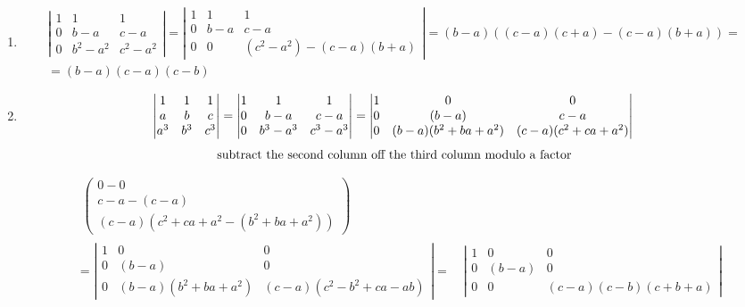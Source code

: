 \documentclass[twoside]{amsart}
\theoremstyle{plain}
\theoremstyle{definition}
\newcommand{\exercisehead}[1]
  {
   \noindent{\small\bf Exercise #1.}
   \smallskip}
\begin{document}
\exercisehead{3}
\begin{enumerate}
\item \[
  \begin{gathered}
\left| \begin{matrix} 1 & 1 & 1 \\ 0 & b-a & c-a \\ 0 & b^2 - a^2 & c^2 - a^2 \end{matrix} \right| = \left| \begin{matrix} 1 & 1 & 1 \\ 0 & b-a & c-a \\ 0 & 0 & (c^2 - a^2)-(c-a)(b+a) \end{matrix} \right| = (b-a)((c-a)(c+a) - (c-a)(b+a)) = \\ 
= \boxed{ (b-a)(c-a)(c-b)  }
\end{gathered}
\]
\item \[
      \left| \begin{matrix} 1 & 1 & 1 \\ a & b & c \\ a^3 & b^3 & c^3 \end{matrix} \right|  = \left| \begin{matrix} 1 & 1 & 1 \\ 0 & b-a & c-a \\ 0 & b^3 -a^3 & c^3 -a^3 \end{matrix} \right| = \left| \begin{matrix} 1 & 0 & 0 \\ 0 & (b-a) & c-a \\ 0 & (b-a)(b^2 + ba + a^2) & (c-a)(c^2 + ca + a^2) \end{matrix} \right| \\
\]
\[
      \text{ subtract the second column off the third column modulo a factor }  \\
\]
\[
\begin{aligned}
 & \begin{gathered}
      \left( \begin{matrix} 0 - 0 \\ c-a - (c-a) \\ (c-a)( c^2 + ca + a^2 - (b^2 + ba +a^2) ) \end{matrix} \right)
\end{gathered} \\
    & = \left| \begin{matrix} 1 & 0 & 0 \\ 0 & (b-a) & 0 \\ 0 & (b-a)(b^2 +ba +a^2) & (c-a)(c^2 -b^2 +ca - ab) \end{matrix} \right|  = \quad \left| \begin{matrix} 1 & 0 & 0 \\ 0 & (b-a) & 0 \\ 0 & 0 & (c-a)(c-b)(c+b +a) \end{matrix} \right| \\

\end{aligned}\]
\end{enumerate}
\end{document}

